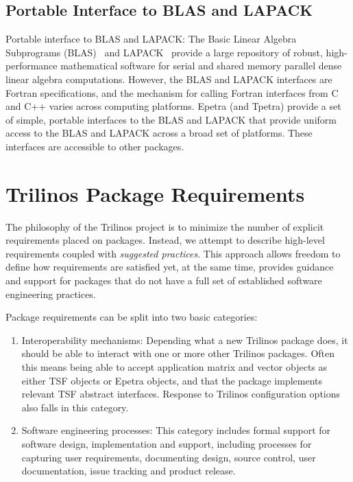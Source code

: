 \documentclass[12pt,relax]{TrilinosDevGuide}
\begin{document}

	\subsection{Portable Interface to BLAS and LAPACK}

Portable interface to BLAS and LAPACK: The Basic Linear Algebra
Subprograms (BLAS)~\cite{BLAS1,BLAS2,BLAS3} and LAPACK~\cite{lapack}
provide a large repository of robust, high-performance mathematical
software for serial and shared memory parallel dense linear algebra
computations.  However, the BLAS and LAPACK interfaces are Fortran
specifications, and the mechanism for calling Fortran interfaces from
C and C++ varies across computing platforms.  Epetra (and Tpetra)
provide a set of simple, portable interfaces to the BLAS and LAPACK
that provide uniform access to the BLAS and LAPACK across a broad
set of platforms.  These interfaces are accessible to
other packages.


\section{Trilinos Package Requirements}
\label{Section:PackageRequirements}
The philosophy of the Trilinos project is to minimize the number of
explicit requirements placed on packages.  Instead, we attempt to
describe high-level requirements coupled with {\it suggested
practices}. This approach allows freedom to define how
requirements are satisfied yet, at the same time, provides guidance
and support for packages that do not have a full set of established
software engineering practices. 

Package requirements can be split into two basic categories:
\begin{enumerate}
\item Interoperability mechanisms: Depending what a new Trilinos
package does, it should be able to interact with one or more other
Trilinos packages.  Often this means being able to accept application
matrix and vector objects as either TSF objects or Epetra objects, and
that the package implements relevant TSF abstract interfaces.
Response to Trilinos configuration options also falls in this category.
\item Software engineering processes: This category includes formal
support for software design, implementation and support, including
processes for capturing user requirements, documenting
design, source control, user documentation, issue tracking and product
release.
\end{enumerate}
\end{document}
